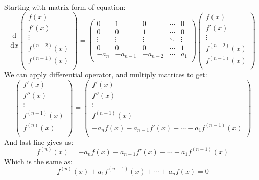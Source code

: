 \documentclass[12pt]{article}
\begin{document}
\subsection{}
Starting with matrix form of equation:
\begin{equation}
    \frac{\mathrm{d}}{\mathrm{d}x}
    \begin{pmatrix}
        f(x) \\
        f'(x) \\
        \vdots \\
        f^{(n-2)}(x) \\
        f^{(n-1)}(x) \\
    \end{pmatrix} = \begin{pmatrix}
        0 & 1 & 0 & \cdots  & 0 \\
        0 & 0 & 1 & \cdots  & 0 \\
        \vdots & \vdots & \vdots & \ddots & \vdots \\
        0 & 0 & 0 & \cdots & 1\\
        -a_n & -a_{n-1} & -a_{n-2} & \cdots & a_1\\ 
    \end{pmatrix}
    \begin{pmatrix}
        f(x) \\
        f'(x) \\
        \vdots \\
        f^{(n-2)}(x) \\
        f^{(n-1)}(x) \\
    \end{pmatrix}
\end{equation}
We can apply differential operator, and multiply matrices to get:
\begin{equation}
    \begin{pmatrix}
        f'(x) \\
        f''(x) \\
        \vdots \\
        f^{(n-1)}(x) \\
        f^{(n)}(x) \\
    \end{pmatrix}  = 
    \begin{pmatrix}
        f'(x) \\
        f''(x) \\
        \vdots \\
        f^{(n-1)}(x) \\
        -a_n f(x) - a_{n-1} f'(x) - \cdots - a_1 f^{(n-1)}(x) \\
    \end{pmatrix}
\end{equation}
And last line gives us:
\begin{equation}
    f^{(n)}(x) = -a_n f(x) - a_{n-1} f'(x) - \cdots - a_1 f^{(n-1)}(x)
\end{equation}
Which is the same as:
\begin{equation}
    f^{(n)}(x) + a_1 f^{(n-1)}(x) + \cdots + a_n f(x) = 0
\end{equation}
\end{document}
